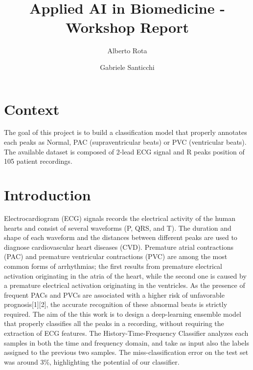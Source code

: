 \documentclass[conference]{IEEEtran}
\begin{document}
\title{Applied AI in Biomedicine - Workshop Report}

\author{
    Alberto Rota
    \\
\and
    Gabriele Santicchi 
    }
\maketitle

\section{Context}
    The goal of this project is to build a classification model that
    properly annotates each peaks as Normal, PAC (supraventricular
    beats) or PVC (ventricular beats). The available dataset is
    composed of 2-lead ECG signal and R peaks position of 105 patient 
    recordings. 

\section{Introduction}
    Electrocardiogram (ECG) signals records the electrical activity of
    the human hearts and consist of several waveforms (P, QRS, and T).
    The duration and shape of each waveform and the distances between
    different peaks are used to diagnose cardiovascular heart diseases
    (CVD). Premature atrial contractions (PAC) and premature
    ventricular contractions (PVC) are among the most common forms of
    arrhythmias; the first results from premature electrical
    activation originating in the atria of the heart, while the second
    one is caused by a premature electrical activation originating in
    the ventricles. As the presence of frequent PACs and PVCs are
    associated with a higher risk of unfavorable prognosis[1][2], the
    accurate recognition of these abnormal beats is strictly required.
    The aim of the this work is to design a deep-learning ensemble
    model that properly classifies all the peaks in a recording,
    without requiring the extraction of ECG features. The
    History-Time-Frequency Classifier analyzes each samples in both
    the time and frequency domain, and take as input also the labels
    assigned to the previous two samples. The miss-classification
    error on the test set was around 3\%, highlighting the potential
    of our classifier. 
\end{document}
